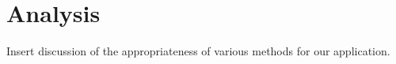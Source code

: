 \section{Analysis}

Insert discussion of the appropriateness of various methods for our 
application.

